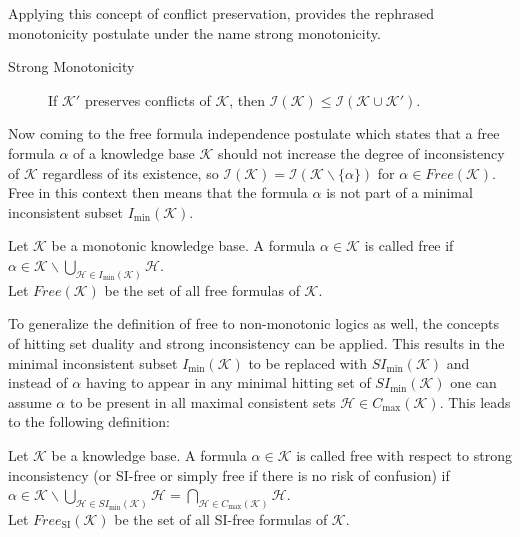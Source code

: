 Applying this concept of conflict preservation, \cite{ulbricht_handling_2020} provides the rephrased monotonicity postulate under the name strong monotonicity.

\begin{description}
    \item[Strong Monotonicity] If \(\mathcal{K}'\) preserves conflicts of \(\mathcal{K}\), then \(\mathcal{I}(\mathcal{K}) \leq \mathcal{I}(\mathcal{K \cup \mathcal{K}'})\).
\end{description}

Now coming to the free formula independence postulate which states that a free formula \(\alpha\) of a knowledge base \(\mathcal{K}\) should not increase the degree of inconsistency of \(\mathcal{K}\) regardless of its existence, so \(\mathcal{I}(\mathcal{K}) = \mathcal{I}(\mathcal{K} \backslash \{\alpha\})\) for \(\alpha \in Free(\mathcal{K})\). Free in this context then means that the formula \(\alpha\) is not part of a minimal inconsistent subset \(I_{\min}(\mathcal{K})\).

\begin{definition}
    Let \(\mathcal{K}\) be a monotonic knowledge base. A formula \(\alpha \in \mathcal{K}\) is called free if\\
    \(\alpha \in \mathcal{K} \backslash \bigcup\limits_{\mathcal{H} \in I_{\min}(\mathcal{K})} \mathcal{H}\).\\
    Let \(Free(\mathcal{K})\) be the set of all free formulas of \(\mathcal{K}\).
\end{definition}

To generalize the definition of free to non-monotonic logics as well, the concepts of hitting set duality and strong inconsistency can be applied. This results in the minimal inconsistent subset \(I_{\min}(\mathcal{K})\) to be replaced with \(SI_{\min}(\mathcal{K})\) and instead of \(\alpha\) having to appear in any minimal hitting set of \(SI_{\min}(\mathcal{K})\) one can assume \(\alpha\) to be present in all maximal consistent sets \(\mathcal{H} \in C_{\max}(\mathcal{K})\). This leads to the following definition:

\begin{definition}
    Let \(\mathcal{K}\) be a knowledge base. A formula \(\alpha \in \mathcal{K}\) is called free with respect to strong inconsistency (or SI-free or simply free if there is no risk of confusion) if\\
    \(\alpha \in \mathcal{K} \backslash \bigcup\limits_{\mathcal{H} \in SI_{\min}(\mathcal{K})} \mathcal{H} = \bigcap\limits_{\mathcal{H} \in C_{\max}(\mathcal{K})} \mathcal{H}\).\\
    Let \(Free_{\text{SI}}(\mathcal{K})\) be the set of all SI-free formulas of \(\mathcal{K}\).
\end{definition}

